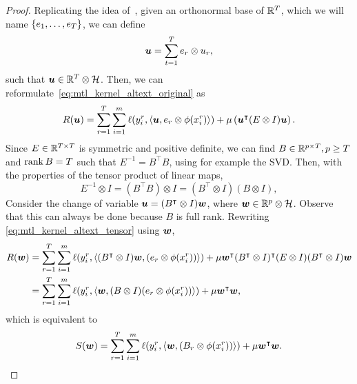 \begin{proof}
    Replicating the idea of~\cite{EvgeniouMP05}, given an orthonormal base of $\mathbb{R}^T$, which we will name $\left\{e_1, \ldots, e_T\right\}$, we can define
$$ \bm{u} = \sum_{t=1}^T e_r \otimes u_r ,$$
such that $\bm{u} \in \mathbb{R}^T \otimes \mathcal{H}$. Then, we can reformulate~\eqref{eq:mtl_kernel_altext_original} as
\begin{equation}
    \label{eq:mtl_kernel_altext_tensor}
    \begin{aligned}
        &R(\myvec{u}) = \sum_{r=1}^{\ntasks} \sum_{i=1}^\npertask \lossf(y_i^r, \dotp{\myvec{u}}{e_r \otimes \phi(x_i^r)}) + \mu \left(  \myvec{u}^\intercal (E \otimes I) \myvec{u} \right).\\
    \end{aligned}
\end{equation}
Since ${E} \in \mathbb{R}^{T \times T}$ is symmetric and positive definite, we can find $B \in \mathbb{R}^{p \times T}, p \geq T$ and $\operatorname{rank}{B} = T$ such that $E^{-1} = 
{B^\intercal} {B}$, using for example the SVD. 
% 
Then, with the properties of the tensor product of linear maps,  $$ E^{-1} \otimes I = (B^\intercal B) \otimes I = (B^\intercal \otimes I) (B \otimes I),$$
%
Consider the change of variable $\bm{u} = (B^\intercal \otimes I)\bm{w}$, where $\bm{w} \in \mathbb{R}^p \otimes \mathcal{H}$. Observe that this can always be done because 
$B$ is full rank. Rewriting \eqref{eq:mtl_kernel_altext_tensor} using $\bm{w}$,
\begin{equation}
    \nonumber
    \begin{aligned}
        R(\bm{w}) &= \sum_{r=1}^{T} \sum_{i=1}^m \ell(y_i^r, \left\langle (B^\intercal \otimes I) \bm{w},  (e_r \otimes \phi(x_i^r)) \right\rangle) + \mu  \bm{w}^\intercal (B^\intercal \otimes I)^\intercal (E \otimes I) (B^\intercal \otimes I)\bm{w} \\
        &= \sum_{r=1}^{T} \sum_{i=1}^m \ell(y_i^r, \left\langle \bm{w}, (B \otimes I) (e_r \otimes \phi(x_i^r)) \right\rangle) + \mu  \bm{w}^\intercal \bm{w} ,\\
    \end{aligned}
\end{equation}
which is equivalent to
\begin{equation}
    \nonumber
    \begin{aligned}
        &S(\bm{w}) = \sum_{r=1}^{T} \sum_{i=1}^m \ell(y_i^r, \left\langle \bm{w}, (B_r \otimes \phi(x_i^r)) \right\rangle) + \mu  \bm{w}^\intercal \bm{w} .\\
    \end{aligned}
\end{equation}


\end{proof}
